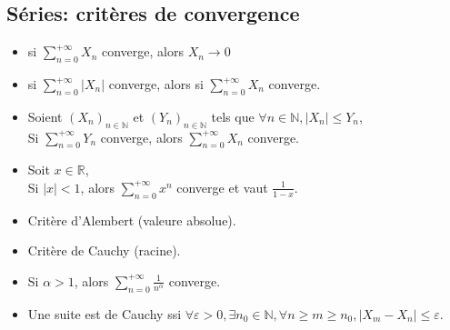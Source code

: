 \documentclass[a4paper,11pt]{report}
\begin{document}
\subsection{Séries: critères de convergence}
\begin{itemize}
	\item si $\sum\limits_{n=0}^{+\infty}{X_n}$ converge, alors $X_n \rightarrow 0$\\
	\item si $\sum\limits_{n=0}^{+\infty}{|X_n|}$ converge, alors si $\sum\limits_{n=0}^{+\infty}{X_n}$ converge.\\
	\item Soient $(X_n)_{n\in\mathbb{N}}$ et $(Y_n)_{n\in\mathbb{N}}$ tels que $\forall n \in \mathbb{N}, |X_n| \le Y_n$,\\
	Si $\sum\limits_{n=0}^{+\infty}{Y_n}$ converge, alors $\sum\limits_{n=0}^{+\infty}{X_n}$ converge.\\
	\item Soit $x \in \mathbb{R}$,\\
	Si $|x|<1$, alors $\sum\limits_{n=0}^{+\infty}{x^n}$ converge et vaut $\frac{1}{1-x}$.\\
	\item Critère d'Alembert (valeure absolue).\\
	\item Critère de Cauchy (racine).\\
	\item Si $\alpha > 1$, alors $\sum\limits_{n=0}^{+\infty}{\frac{1}{n^\alpha}}$ converge.\\
	\item Une suite est de Cauchy ssi $\forall \varepsilon>0, \exists n_0 \in \mathbb{N}, \forall n \ge m \ge n_0, |X_m-X_n| \le \varepsilon$.
\end{itemize}
\end{document}
